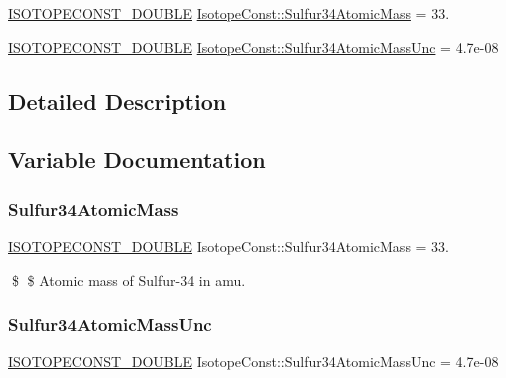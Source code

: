 \begin{DoxyCompactItemize}
\item 
\mbox{\hyperlink{group___isotope_const-_macros_ga8f45a7272ce02c0b4c65c44636ed719a}{I\+S\+O\+T\+O\+P\+E\+C\+O\+N\+S\+T\+\_\+\+D\+O\+U\+B\+LE}} \mbox{\hyperlink{group___isotope_const-_sulfur-_s34_gaa7dc3a414cd58f9253e192994cbbc63c}{Isotope\+Const\+::\+Sulfur34\+Atomic\+Mass}} = 33.
\item 
\mbox{\hyperlink{group___isotope_const-_macros_ga8f45a7272ce02c0b4c65c44636ed719a}{I\+S\+O\+T\+O\+P\+E\+C\+O\+N\+S\+T\+\_\+\+D\+O\+U\+B\+LE}} \mbox{\hyperlink{group___isotope_const-_sulfur-_s34_ga6b1210ea883ffa273919aea3d80277f3}{Isotope\+Const\+::\+Sulfur34\+Atomic\+Mass\+Unc}} = 4.\+7e-\/08
\end{DoxyCompactItemize}


\subsection{Detailed Description}


\subsection{Variable Documentation}
\mbox{\label{group___isotope_const-_sulfur-_s34_gaa7dc3a414cd58f9253e192994cbbc63c}} 
\subsubsection{\texorpdfstring{Sulfur34\+Atomic\+Mass}{Sulfur34AtomicMass}}
{\footnotesize\ttfamily \mbox{\hyperlink{group___isotope_const-_macros_ga8f45a7272ce02c0b4c65c44636ed719a}{I\+S\+O\+T\+O\+P\+E\+C\+O\+N\+S\+T\+\_\+\+D\+O\+U\+B\+LE}} Isotope\+Const\+::\+Sulfur34\+Atomic\+Mass = 33.}

\$ \$ Atomic mass of Sulfur-\/34 in amu. \mbox{\label{group___isotope_const-_sulfur-_s34_ga6b1210ea883ffa273919aea3d80277f3}} 
\subsubsection{\texorpdfstring{Sulfur34\+Atomic\+Mass\+Unc}{Sulfur34AtomicMassUnc}}
{\footnotesize\ttfamily \mbox{\hyperlink{group___isotope_const-_macros_ga8f45a7272ce02c0b4c65c44636ed719a}{I\+S\+O\+T\+O\+P\+E\+C\+O\+N\+S\+T\+\_\+\+D\+O\+U\+B\+LE}} Isotope\+Const\+::\+Sulfur34\+Atomic\+Mass\+Unc = 4.\+7e-\/08}

